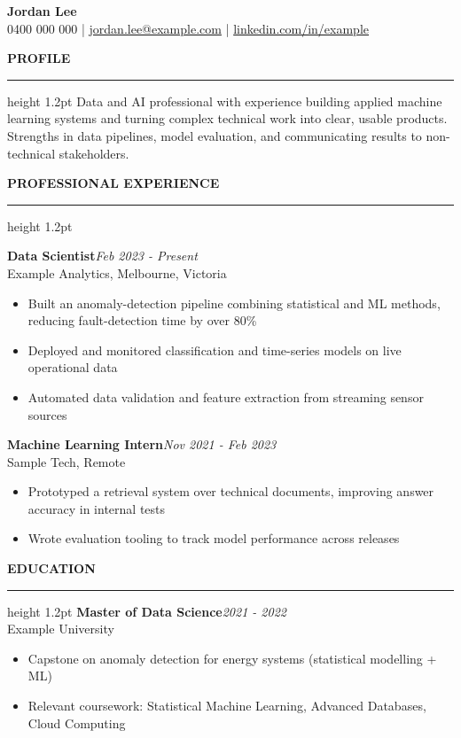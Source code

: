 \documentclass[10pt]{article}
\newcommand{\sectionrule}{\vspace{2pt}\hrule height 1.2pt\vspace{6pt}}
\newcommand{\resumesection}[1]{{\large\textbf{\MakeUppercase{#1}}}\sectionrule}
\newcommand{\jobtitle}[3]{\textbf{#1}\hfill \textit{#2}\\#3\\[2pt]}
\newcommand{\expjobtitle}[3]{\vspace{0pt}\jobtitle{#1}{#2}{#3}}
\begin{document}
\vspace*{0pt}

\begin{center}
{\fontsize{22pt}{26pt}\selectfont\textbf{Jordan Lee}}\\[8pt]
0400 000 000 \;|\; \href{mailto:jordan.lee@example.com}{jordan.lee@example.com} \;|\; \href{https://www.linkedin.com/in/example}{linkedin.com/in/example}
\end{center}

\vspace{6pt}
\raggedright

\resumesection{Profile}
Data and AI professional with experience building applied machine learning systems
and turning complex technical work into clear, usable products. Strengths in data
pipelines, model evaluation, and communicating results to non-technical stakeholders.

\vspace{8pt}
\resumesection{Professional Experience}
\vspace{0.5em}

\expjobtitle{Data Scientist}{Feb 2023 - Present}{Example Analytics, Melbourne, Victoria}
\begin{itemize}
  \item Built an anomaly-detection pipeline combining statistical and ML methods, reducing fault-detection time by over 80\%
  \item Deployed and monitored classification and time-series models on live operational data
  \item Automated data validation and feature extraction from streaming sensor sources
\end{itemize}

\vspace{0.6em}
\expjobtitle{Machine Learning Intern}{Nov 2021 - Feb 2023}{Sample Tech, Remote}
\begin{itemize}
  \item Prototyped a retrieval system over technical documents, improving answer accuracy in internal tests
  \item Wrote evaluation tooling to track model performance across releases
\end{itemize}

\vspace{8pt}
\resumesection{Education}
\vspace{0.5em}
\jobtitle{Master of Data Science}{2021 - 2022}{Example University}
\begin{itemize}
  \item Capstone on anomaly detection for energy systems (statistical modelling + ML)
  \item Relevant coursework: Statistical Machine Learning, Advanced Databases, Cloud Computing
\end{itemize}
\end{document}
